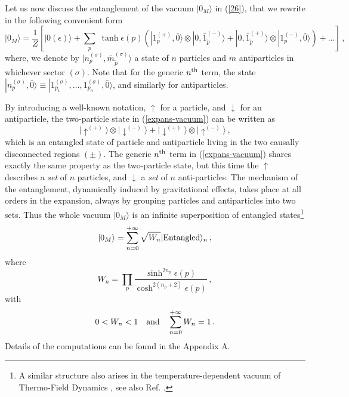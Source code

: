 \noindent Let us now discuss the entanglement of the vacuum $|0_M
\rangle$ in (\ref{26}), that we rewrite in the following
convenient form
\begin{equation}
  |0_M \rangle = \frac{1}{Z} \left[ |0(\epsilon)\rangle  + \sum_p \;\tanh\epsilon (p)
  \left( | 1^{(+)}_p , \bar{0} \rangle \otimes |0, \bar{1}^{(-)}_{\tilde p} \rangle
  + | 0, \bar{1}^{(+)}_{\tilde p} \rangle \otimes |1^{(-)}_{ p} , \bar{0} \rangle
  \right)  + \dots \right] \,, \label{expans-vacuum}
\end{equation}
where, we denote by $|n^{(\sigma)}_p, \bar{m}^{(\sigma)}_{\tilde p
}\rangle$ a state of $n$ particles and $m$ antiparticles in
whichever sector $(\sigma)$. Note that for the generic $n^{\rm
th}$ term, the state $| n^{(\sigma)}_p , \bar{0} \rangle \equiv
|1^{(\sigma)}_{p_1}, \ldots, 1^{(\sigma)}_{p_n}, \bar{0} \rangle$,
and similarly for antiparticles.

\noindent By introducing a well-known notation, $\uparrow$ for a
particle, and $\downarrow$ for an antiparticle, the two-particle
state in (\ref{expans-vacuum}) can be written as
\begin{equation}\label{enta-onestate}
| \uparrow^{(+)} \rangle \otimes | \downarrow^{(-)} \rangle + |
\downarrow^{(+)} \rangle \otimes | \uparrow^{(-)} \rangle \,,
\end{equation}
which is an entangled state of particle and antiparticle living in
the two causally disconnected regions $(\pm)$. The generic $n^{\rm
th}$ term in (\ref{expans-vacuum}) shares exactly the same
property as the two-particle state, but this time the $\uparrow$
describes a {\it set} of $n$ particles, and $\downarrow$ a {\it
set} of $n$ anti-particles. The mechanism of the entanglement,
dynamically induced by gravitational effects, takes place at all
orders in the expansion, always by grouping particles and
antiparticles into two sets. Thus the whole vacuum $|0_M\rangle$
is an infinite superposition of entangled states\footnote{A
similar structure also arises in the temperature-dependent vacuum
of Thermo-Field Dynamics \cite{umezawa}, see also Ref.
\cite{cinesi}.}
\begin{equation}\label{enta-series}
  |0_M\rangle = \sum_{n=0}^{+\infty} \sqrt{W_n} |{\rm Entangled} \rangle_n
  \,,
\end{equation}
where
\begin{equation}\label{wn}
  W_n = \prod_p
  \frac{\sinh^{2n_p}\epsilon(p)}{\cosh^{2(n_p+2)}\epsilon(p)}\,,
\end{equation}
with
\begin{equation}\label{wn1}
0< W_n <1 \quad {\rm and} \quad  \sum_{n=0}^{+\infty} W_n = 1 \,.
\end{equation}
Details of the computations can be found in the Appendix A.

